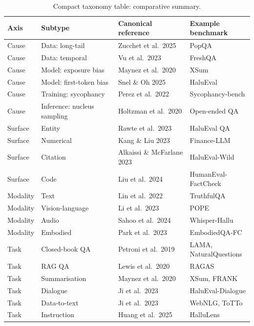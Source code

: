\documentclass{article}
\begin{document}
\begin{table}[t]
\centering
\caption{Compact taxonomy table: comparative summary.}
\label{tab:compact-taxonomy-table}
\begin{tabular}{>{\raggedright\arraybackslash}p{0.0976\linewidth}
  >{\raggedright\arraybackslash}p{0.3293\linewidth}
  >{\raggedright\arraybackslash}p{0.3049\linewidth}
  >{\raggedright\arraybackslash}p{0.2683\linewidth}}
\toprule
Axis & Subtype & Canonical reference & Example benchmark \\
\midrule
Cause & Data: long-tail & Zucchet et al.~2025 & PopQA \\
Cause & Data: temporal & Vu et al.~2023 & FreshQA \\
Cause & Model: exposure bias & Maynez et al.~2020 & XSum \\
Cause & Model: first-token bias & Snel \& Oh 2025 & HaluEval \\
Cause & Training: sycophancy & Perez et al.~2022 & Sycophancy-bench \\
Cause & Inference: nucleus sampling & Holtzman et al.~2020 & Open-ended QA \\
Surface & Entity & Rawte et al.~2023 & HaluEval QA \\
Surface & Numerical & Kang \& Liu 2023 & Finance-LLM \\
Surface & Citation & Alkaissi \& McFarlane 2023 & HaluEval-Wild \\
Surface & Code & Liu et al.~2024 & HumanEval-FactCheck \\
Modality & Text & Lin et al.~2022 & TruthfulQA \\
Modality & Vision-language & Li et al.~2023 & POPE \\
Modality & Audio & Sahoo et al.~2024 & Whisper-Hallu \\
Modality & Embodied & Park et al.~2023 & EmbodiedQA-FC \\
Task & Closed-book QA & Petroni et al.~2019 & LAMA, NaturalQuestions \\
Task & RAG QA & Lewis et al.~2020 & RAGAS \\
Task & Summarisation & Maynez et al.~2020 & XSum, FRANK \\
Task & Dialogue & Ji et al.~2023 & HaluEval-Dialogue \\
Task & Data-to-text & Ji et al.~2023 & WebNLG, ToTTo \\
Task & Instruction & Huang et al.~2025 & HalluLens \\
\end{tabular}
\end{table}
\end{document}

